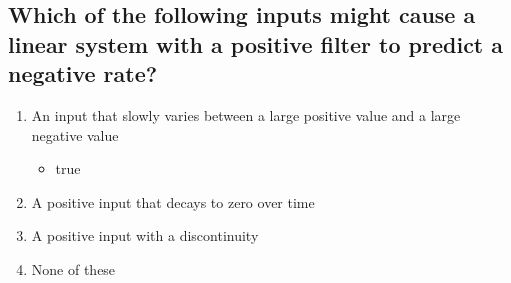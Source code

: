 \documentclass{article}
\begin{document}
\subsection{Which of the following inputs might cause a linear system with a positive filter to predict a negative rate?}

\begin{enumerate}
    \item An input that slowly varies between a large positive value and a large negative value
      \begin{itemize}
        \item true
      \end{itemize}
    \item A positive input that decays to zero over time
    \item A positive input with a discontinuity
    \item None of these
\end{enumerate}
\end{document}
